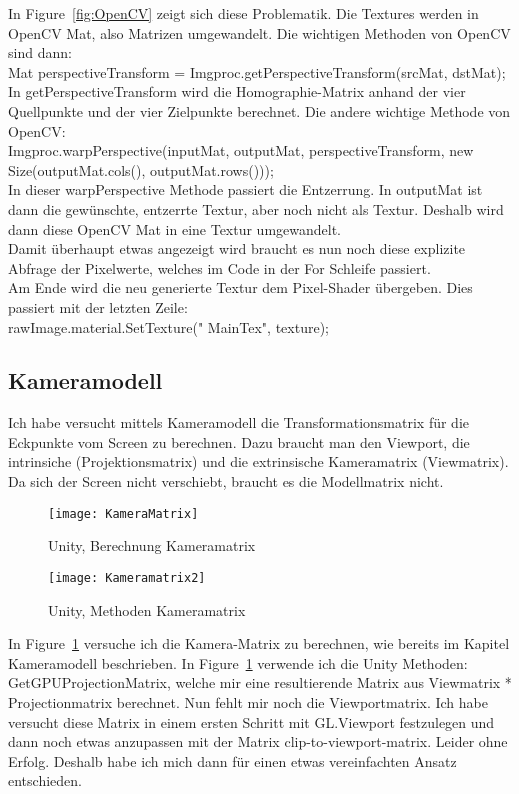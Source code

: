 In Figure~\ref{fig:OpenCV} zeigt sich diese Problematik. Die Textures werden in OpenCV Mat, also Matrizen umgewandelt. Die wichtigen Methoden von OpenCV sind dann: \\  
Mat perspectiveTransform = Imgproc.getPerspectiveTransform(srcMat, dstMat); \\
In getPerspectiveTransform wird die Homographie-Matrix anhand der vier Quellpunkte und der vier Zielpunkte berechnet. Die andere wichtige Methode von OpenCV: \\ 
 Imgproc.warpPerspective(inputMat, outputMat, perspectiveTransform, new Size(outputMat.cols(), outputMat.rows())); \\ In dieser warpPerspective Methode passiert die Entzerrung. In outputMat ist dann die gewünschte, entzerrte Textur, aber noch nicht als Textur. Deshalb wird dann diese OpenCV Mat in eine Textur umgewandelt. \\ Damit überhaupt etwas angezeigt wird braucht es nun noch diese explizite Abfrage der Pixelwerte, welches im Code in der For Schleife passiert.  \\ Am Ende wird die neu generierte Textur dem Pixel-Shader übergeben. Dies passiert mit der letzten Zeile: \\
 rawImage.material.SetTexture(" MainTex", texture);

\subsection{Kameramodell}
Ich habe versucht mittels Kameramodell die Transformationsmatrix für die Eckpunkte vom Screen zu berechnen. Dazu braucht man den Viewport, die intrinsiche (Projektionsmatrix) und die extrinsische Kameramatrix (Viewmatrix). Da sich der Screen nicht verschiebt, braucht es die Modellmatrix nicht.

\begin{figure}[H]
	\texttt{[image: KameraMatrix]}
	\caption{Unity, Berechnung Kameramatrix}
	\label{fig:Berechnung Kameramatrix}
\end{figure}

\begin{figure}[H]
	\texttt{[image: Kameramatrix2]}
	\caption{Unity, Methoden Kameramatrix}
	\label{fig:Kameramatrix Methoden}
\end{figure}

In Figure~\ref{fig:Berechnung Kameramatrix} versuche ich die Kamera-Matrix zu berechnen, wie bereits im Kapitel Kameramodell beschrieben. In Figure~\ref{fig:Berechnung Kameramatrix} verwende ich die Unity Methoden: GetGPUProjectionMatrix, welche mir eine resultierende Matrix aus Viewmatrix * Projectionmatrix berechnet. Nun fehlt mir noch die Viewportmatrix. Ich habe versucht diese Matrix in einem ersten Schritt mit GL.Viewport festzulegen und dann noch etwas anzupassen mit der Matrix clip-to-viewport-matrix. Leider ohne Erfolg. Deshalb habe ich mich dann für einen etwas vereinfachten Ansatz entschieden.

